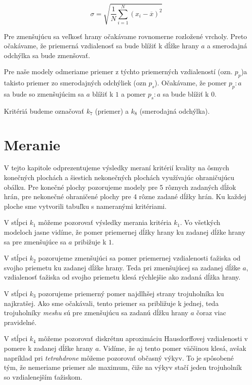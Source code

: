 \begin{enumerate}
{    \begin{equation}
    \label{eq:std}
    \sigma = \sqrt{\frac{1}{N} \sum\limits_{i=1}^{N}(x_i - \overline{x})^2} 
    \end{equation}

    Pre zmenšujúcu sa veľkosť hrany očakávame rovnomerne rozložené vrcholy. Preto očakávame, že 
    priemerná vzdialenosť sa bude blížiť k dĺžke hrany $a$ a smerodajná odchýlka sa bude zmenšovať.
    
    Pre naše modely odmeriame priemer z týchto priemerných vzdialeností (ozn. $p_p$)a takisto priemer 
    zo smerodajných odchýliek (ozn $p_s$). Očakávame, že pomer $p_p : a$ sa bude so zmenšujúcim sa $a$
    blížiť k $1$ a pomer $p_s : a$ sa bude blížiť k $0$.

    Kritériá budeme označovať $k_7$ (priemer) a $k_8$ (smerodajná odchýlka).
}
\end{enumerate}

\section{Meranie}

V tejto kapitole odprezentujeme výsledky meraní kritérií kvality na ôsmych konečných plochách
a šiestich nekonečných plochách využívajúc ohraničujúcu obálku.
Pre konečné plochy pozorujeme modely pre 5 rôznych zadaných dĺžok hrán, pre nekonečné ohraničené plochy pre
4 rôzne zadané dĺžky hrán. Ku každej ploche sme vytvorili tabuľku s nameranými kritériami. 

V stĺpci $k_1$ môžeme pozorovať výsledky merania kritéria $k_1$. Vo všetkých modeloch jasne vidíme, 
že pomer priemernej dĺžky hrany ku zadanej dĺžke hrany sa pre zmenšujúce sa $a$ pribižuje k $1$.

V stĺpci $k_2$ pozorujeme zmenšujúci sa pomer priemernej vzdialenosti ťažiska od svojho priemetu ku 
zadanej dĺžke hrany. Teda pri zmenšujúcej sa zadanej dĺžke $a$, vzdialenosť ťažiska od svojho priemetu 
klesá rýchlejšie ako zadaná dĺžka hrany.

V stĺpci $k_3$ pozorujeme priemerný pomer najdlhšej strany trojuholníka ku najkratšej. Ako sme očakávali,
tento priemer sa približuje k jednej, teda trojuholníky \textit{meshu} sú pre zmenšujúcu sa zadanú dĺžku hrany
$a$ čoraz viac pravidelné.

V stĺpci $k_4$ môžeme pozorovať diskrétnu aproximáciu Hausdorffovej vzdialenosti v pomere k zadanej dĺžke 
hrany $a$. Vidíme, že aj tento pomer väčšinou klesá, avšak napríklad pri \textit{tetrahdrone} môžeme 
pozorovať občasný výkyv. To je spôsobené tým, že nemeriame priemer ale maximum, čiže na výkyv stačí jeden 
trojuholník so vzdialenejším ťažiskom. 

